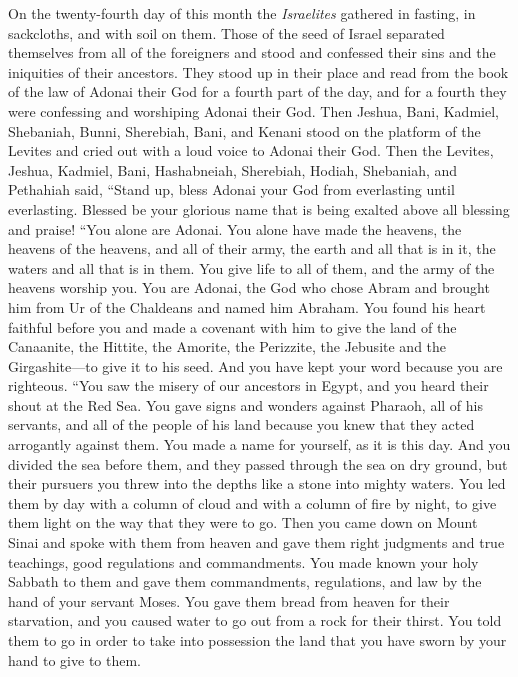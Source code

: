 \begin{biblechapter} %
 On the twenty-fourth day of this month the \textit{Israelites} gathered in fasting, in sackcloths, and with soil on them.
\verse Those of the seed of Israel separated themselves from all of the foreigners and stood and confessed their sins and the iniquities of their ancestors.
\verse They stood up in their place and read from the book of the law of Adonai their God for a fourth part of the day, and for a fourth they were confessing and worshiping Adonai their God.
\verse Then Jeshua, Bani, Kadmiel, Shebaniah, Bunni, Sherebiah, Bani, and Kenani stood on the platform of the Levites and cried out with a loud voice to Adonai their God.
\verse Then the Levites, Jeshua, Kadmiel, Bani, Hashabneiah, Sherebiah, Hodiah, Shebaniah, and Pethahiah said, “Stand up, bless Adonai your God from everlasting until everlasting. Blessed be your glorious name that is being exalted above all blessing and praise!
\verse “You alone are Adonai. You alone have made the heavens, the heavens of the heavens, and all of their army, the earth and all that is in it, the waters and all that is in them. You give life to all of them, and the army of the heavens worship you.
\verse You are Adonai, the God who chose Abram and brought him from Ur of the Chaldeans and named him Abraham.
\verse You found his heart faithful before you and made a covenant with him to give the land of the Canaanite, the Hittite, the Amorite, the Perizzite, the Jebusite and the Girgashite—to give it to his seed. And you have kept your word because you are righteous.
\verse “You saw the misery of our ancestors in Egypt, and you heard their shout at the Red Sea.
\verse You gave signs and wonders against Pharaoh, all of his servants, and all of the people of his land because you knew that they acted arrogantly against them. You made a name for yourself, as it is this day.
\verse And you divided the sea before them, and they passed through the sea on dry ground, but their pursuers you threw into the depths like a stone into mighty waters.
\verse You led them by day with a column of cloud and with a column of fire by night, to give them light on the way that they were to go.
\verse Then you came down on Mount Sinai and spoke with them from heaven and gave them right judgments and true teachings, good regulations and commandments.
\verse You made known your holy Sabbath to them and gave them commandments, regulations, and law by the hand of your servant Moses.
\verse You gave them bread from heaven for their starvation, and you caused water to go out from a rock for their thirst. You told them to go in order to take into possession the land that you have sworn by your hand to give to them.

\end{biblechapter}
